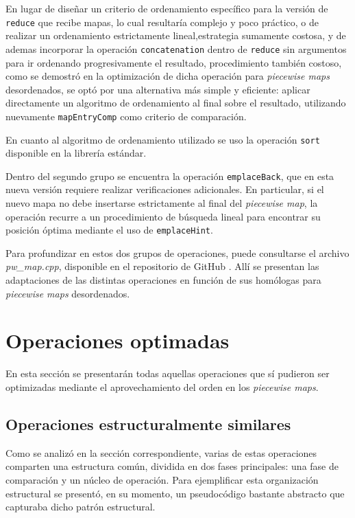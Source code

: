 En lugar de diseñar un criterio de ordenamiento específico para la versión de \texttt{reduce} que recibe mapas, lo cual resultaría complejo y poco práctico, o de realizar un ordenamiento estrictamente lineal,estrategia sumamente costosa, y de ademas incorporar la operación \texttt{concatenation} dentro de \texttt{reduce} sin argumentos para ir ordenando progresivamente el resultado, procedimiento también costoso, como se demostró en la optimización de dicha operación para \textit{piecewise maps} desordenados, se optó por una alternativa más simple y eficiente: aplicar directamente un algoritmo de ordenamiento al final sobre el resultado, utilizando nuevamente \texttt{mapEntryComp} como criterio de comparación.


En cuanto al algoritmo de ordenamiento utilizado se uso la operación \texttt{sort} disponible en la librería estándar.

Dentro del segundo grupo se encuentra la operación \texttt{emplaceBack}, que en esta nueva versión requiere realizar verificaciones adicionales. En particular, si el nuevo mapa no debe insertarse estrictamente al final del \textit{piecewise map}, la operación recurre a un procedimiento de búsqueda lineal para encontrar su posición óptima mediante el uso de \texttt{emplaceHint}.

Para profundizar en estos dos grupos de operaciones, puede consultarse el archivo \textit{pw\_map.cpp}, disponible en el repositorio de GitHub \cite{sbg}. Allí se presentan las adaptaciones de las distintas operaciones en función de sus homólogas para \textit{piecewise maps} desordenados.



\section{Operaciones optimadas}

En esta sección se presentarán todas aquellas operaciones que sí pudieron ser optimizadas mediante el aprovechamiento del orden en los \textit{piecewise maps}.

\subsection{Operaciones estructuralmente similares}

Como se analizó en la sección correspondiente, varias de estas operaciones comparten una estructura común, dividida en dos fases principales: una fase de comparación y un núcleo de operación. Para ejemplificar esta organización estructural se presentó, en su momento, un pseudocódigo bastante abstracto que capturaba dicho patrón estructural.

